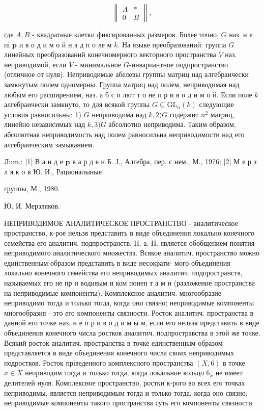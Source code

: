 \documentclass[10pt]{article}
\begin{document}
\[

\left\|\begin{array}{ll}

A & * \\

0 & B

\end{array}\right\|,

\]



где $A, B$ - квадратные клетки фиксированных размеров. Более точно, $G$ наз. н е пі $\mathbf{p}$ и в о д и м о й н а д п о ле м $k$. На языке преобразований: группа $G$ линейных преобразований конечномерного векторного пространства $V$ наз. неприводимой, если $V$ - минимальное $G$-инвариантное подпространство (отличное от нуля). Неприводимые абелевы группы матриц над алгебраически замкнутым полем одномерны. Группа матриц над полем, неприводимая над любым его расширением, наз. а б с о лют т о не п р и в о д и м о й. Если поле $k$ алгебраически замкнуто, то для всякой группы $G \subseteq \mathrm{GL}_{n}(k)$ следующие условия равносильны: 1) $G$ непршводима над $k, 2) G$ содержит $n^{2}$ матриц, линейно независимых над $k, 3) G$ абсолютно неприводима. Таким образом, абсолютная неприводимость над полем равносильна неприводимости над его алгебраическим замыканием.



Лum.: [1] В а н д е $\mathbf{p}$ в а р д е н Б. Ј., Алгебра, пер. с нем., М., 1976; [2] М е р з л я к о в Ю. И., Рационалыные

группы, М., 1980.

Ю. И. Мерзляков.



НЕПРИВОДИМОЕ АНАЛИТИЧЕСКОЕ ПРОСТРАНСТВО - аналитическое пространство, к-рое нельзя представить в виде объединения локально конечного семейства его аналитич. подпространств. Н. а. П. является обобщением понятия неприводимого аналитического множества. Всякое аналитич. пространство можно единственным образом представить в виде несократи- мого объединения локально конечного семейства его неприводимых аналитич. подпространств, называемых его не пр и водияым и ком понен т а м и (разложение пространства на неприводимые компоненты). Комплексное аналитич. многообразие неприводимо тогда и только тогда, когда оно связно; неприводимые компоненты многообразия - это его көмпоненты связности. Росток аналитич. пространства в данной его точке наз. н е п р и в о д и м ы м, если его нельзя представить в виде объединения конечного числа ростков аналитич. подпростравства в этой же точке. Всякий росток аналитич. пространства в точке единственным образом представляется в виде объединения конечного числа своих неприводимых подростков. Росток пріведенного комплексного пространства $(X, 6)$ в точке $x \in X$ неприводим тогда и только тогда, когда локальное кольцо $6_{x}$ не имеет делителей нуля. Комплексное пространство, ростки к-рого во всех его точках неприводимы, является неприводимым тогда и только тогда, когда оно связно; неприводимые компоненты такого пространства суть его компоненты связности.
\end{document}
